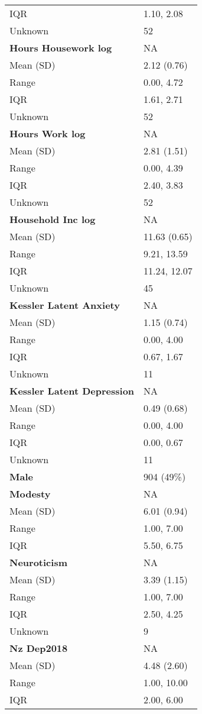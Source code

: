 \documentclass[
  singlecolumn]{article}
\begin{document}
\begin{longtable}[]{@{}ll@{}}
IQR & 1.10, 2.08 \\
Unknown & 52 \\
\textbf{Hours Housework log} & NA \\
Mean (SD) & 2.12 (0.76) \\
Range & 0.00, 4.72 \\
IQR & 1.61, 2.71 \\
Unknown & 52 \\
\textbf{Hours Work log} & NA \\
Mean (SD) & 2.81 (1.51) \\
Range & 0.00, 4.39 \\
IQR & 2.40, 3.83 \\
Unknown & 52 \\
\textbf{Household Inc log} & NA \\
Mean (SD) & 11.63 (0.65) \\
Range & 9.21, 13.59 \\
IQR & 11.24, 12.07 \\
Unknown & 45 \\
\textbf{Kessler Latent Anxiety} & NA \\
Mean (SD) & 1.15 (0.74) \\
Range & 0.00, 4.00 \\
IQR & 0.67, 1.67 \\
Unknown & 11 \\
\textbf{Kessler Latent Depression} & NA \\
Mean (SD) & 0.49 (0.68) \\
Range & 0.00, 4.00 \\
IQR & 0.00, 0.67 \\
Unknown & 11 \\
\textbf{Male} & 904 (49\%) \\
\textbf{Modesty} & NA \\
Mean (SD) & 6.01 (0.94) \\
Range & 1.00, 7.00 \\
IQR & 5.50, 6.75 \\
\textbf{Neuroticism} & NA \\
Mean (SD) & 3.39 (1.15) \\
Range & 1.00, 7.00 \\
IQR & 2.50, 4.25 \\
Unknown & 9 \\
\textbf{Nz Dep2018} & NA \\
Mean (SD) & 4.48 (2.60) \\
Range & 1.00, 10.00 \\
IQR & 2.00, 6.00 \\

\end{longtable}
\end{document}
